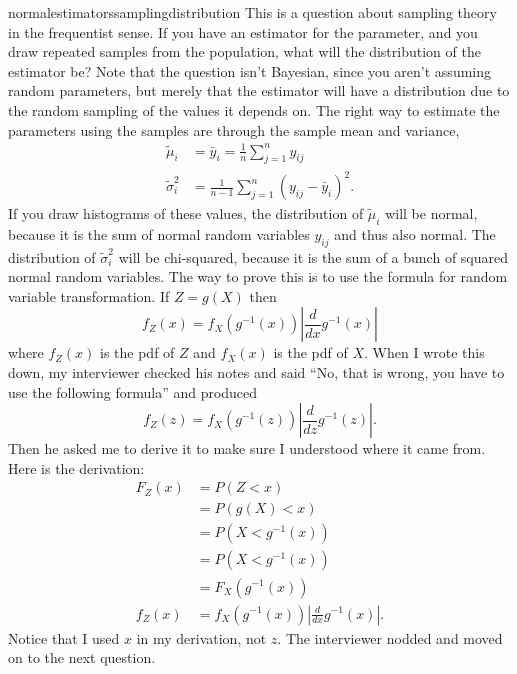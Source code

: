 \begin{answer}{normalestimatorssamplingdistribution}
This is a question about sampling theory in the frequentist sense.
If you have an estimator for the parameter, and you draw repeated samples from the population, what will the distribution of the estimator be?
Note that the question isn't Bayesian, since you aren't assuming random parameters, but merely that the estimator will have a distribution due to the random sampling of the values it depends on.
The right way to estimate the parameters using the samples are through the sample mean and variance,
\begin{align*}
  \tilde{\mu}_i &= \bar{y}_i =  \frac{1}{n}\sum_{j=1}^{n}{y_{ij}} \\
  \tilde{\sigma}^2_i &=
  \frac{1}{n-1} \sum_{j=1}^{n}{(y_{ij} - \bar{y}_i)^2}
 \text{.}
\end{align*}
If you draw histograms of these values, the distribution of
$\tilde{\mu}_i$
will be normal,
because it is the sum of normal random variables $y_{ij}$ and thus also normal.
The distribution of
$\tilde{\sigma}^2_i$
will be chi-squared, because it is the sum of a bunch of squared normal random variables.
The way to prove this is to use the formula for random variable transformation.
If $Z = g(X)$
then
\[
  f_Z(x) =  f_X( g^{-1}(x) )\left| \frac{d}{dx} g^{-1}(x) \right|
\]
where
$f_Z(x)$ is the pdf of $Z$ and
$f_X(x)$ is the pdf of $X$.
When I wrote this down, my interviewer
checked his notes and said
``No, that is wrong, you have to use the following formula'' and produced
\[
  f_Z(z) =  f_X( g^{-1}(z) )\left| \frac{d}{dz} g^{-1}(z) \right|
  \text{.}
\]
Then he asked me to derive it to make sure I understood where it came from.
Here is the derivation:
\begin{align*}
  F_Z(x)
  &=  P(Z < x) \\
  &=  P(g(X) < x) \\
  &=  P(X < g^{-1}(x)) \\
  &=  P(X < g^{-1}(x)) \\
  &=  F_X( g^{-1}(x) ) \\
  f_Z(x) &=  f_X( g^{-1}(x) )\left| \frac{d}{dx} g^{-1}(x) \right|
  \text{.}
\end{align*}
Notice that I used $x$ in my derivation, not $z$.
The interviewer nodded and moved on to the next question.
\end{answer}
